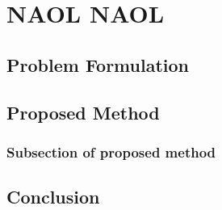 \chapter{NAOL NAOL}

\section{Problem Formulation}

\section{Proposed Method}

\subsection{Subsection of proposed method}

\section{Conclusion}

